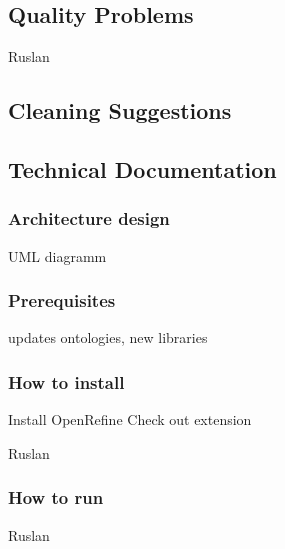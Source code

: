 \subsection{Quality Problems}
Ruslan
\subsection{Cleaning Suggestions}


\subsection{Technical Documentation}
\subsubsection{Architecture design}
UML diagramm

\subsubsection{Prerequisites}
updates ontologies, 
new libraries




\subsubsection{How to install}

Install OpenRefine
Check out extension

Ruslan
\subsubsection{How to run}

Ruslan
\








